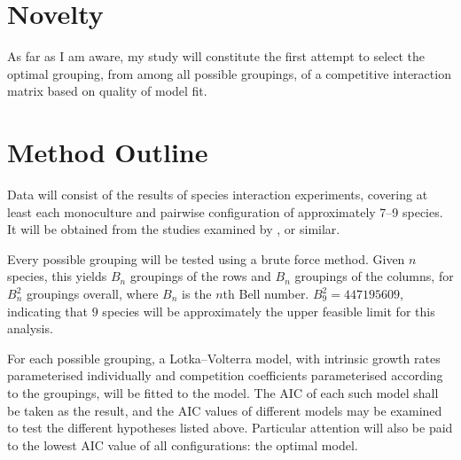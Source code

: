 \documentclass[a4paper,11pt]{article}
\begin{document}
\section{Novelty}

As far as I am aware, my study will constitute the first attempt to select the optimal grouping, from among all possible groupings, of a competitive interaction matrix based on quality of model fit.

\section{Method Outline}

Data will consist of the results of species interaction experiments, covering at least each monoculture and pairwise configuration of approximately 7--9 species.
It will be obtained from the studies examined by \textcite{kinlock2019meta}, or similar.

Every possible grouping will be tested using a brute force method.
Given $n$ species, this yields $B_n$ groupings of the rows and $B_n$ groupings of the columns, for $B_n^2$ groupings overall, where $B_n$ is the $n$th Bell number.
$B_9^2 = \num{447195609}$, indicating that $9$ species will be approximately the upper feasible limit for this analysis.

For each possible grouping, a Lotka--Volterra model, with intrinsic growth rates parameterised individually and competition coefficients parameterised according to the groupings, will be fitted to the model.
The AIC of each such model shall be taken as the result, and the AIC values of different models may be examined to test the different hypotheses listed above.
Particular attention will also be paid to the lowest AIC value of all configurations: the optimal model.

\FloatBarrier
\printbibliography
\end{document}
